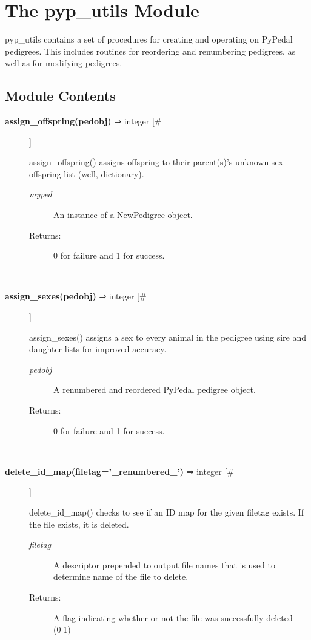 \documentclass{article}
\begin{document}
\section*{The pyp\_utils Module}
\par pyp\_utils contains a set of procedures for creating and operating on PyPedal pedigrees.
This includes routines for reordering and renumbering pedigrees, as well as for modifying
pedigrees.
\subsection*{Module Contents}
\begin{description}
\item[\textbf{assign\_offspring(pedobj)} ⇒ integer [\#]
]
\par assign\_offspring() assigns offspring to their parent(s)'s unknown sex offspring list (well, dictionary).
\begin{description}
\item[\textit{myped}
]
An instance of a NewPedigree object.
\item[Returns:
]
0 for failure and 1 for success.
\end{description}\\

\item[\textbf{assign\_sexes(pedobj)} ⇒ integer [\#]
]
\par assign\_sexes() assigns a sex to every animal in the pedigree using sire and daughter lists for improved accuracy.
\begin{description}
\item[\textit{pedobj}
]
A renumbered and reordered PyPedal pedigree object.
\item[Returns:
]
0 for failure and 1 for success.
\end{description}\\

\item[\textbf{delete\_id\_map(filetag='\_renumbered\_')} ⇒ integer [\#]
]
\par delete\_id\_map() checks to see if an ID map for the given filetag exists.  If the file exists, it is
deleted.
\begin{description}
\item[\textit{filetag}
]
A descriptor prepended to output file names that is used to determine name of the file to delete.
\item[Returns:
]
A flag indicating whether or not the file was successfully deleted (0|1)
\end{description}\\


\end{description}
\end{document}
